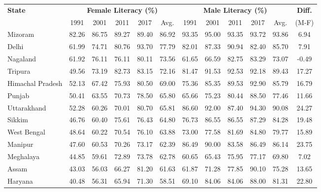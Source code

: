 \begin{table}[h]
    \centering
    \begin{tabular}{lccccccccccc}
        \toprule
        \textbf{State} & \multicolumn{5}{c}{\textbf{Female Literacy (\%)}} & \multicolumn{5}{c}{\textbf{Male Literacy (\%)}} & \textbf{Diff.} \\
        \cmidrule(lr){2-6} \cmidrule(lr){7-11}
        & 1991 & 2001 & 2011 & 2017 & Avg. & 1991 & 2001 & 2011 & 2017 & Avg. & (M-F) \\
        \midrule
        Mizoram          & 82.26 & 86.75 & 89.27 & 89.40 & 86.92 & 93.35 & 95.00 & 93.35 & 93.72 & 93.86 & 6.94 \\
        Delhi           & 61.99 & 74.71 & 80.76 & 93.70 & 77.79 & 82.01 & 87.33 & 90.94 & 82.40 & 85.70 & 7.91 \\  
        Nagaland        & 61.92 & 76.11 & 76.11 & 80.11 & 73.56 & 61.65 & 66.59 & 82.75 & 83.29 & 73.07 & -0.49 \\
        Tripura         & 49.56 & 73.19 & 82.73 & 83.15 & 72.16 & 81.47 & 91.53 & 92.53 & 92.18 & 89.43 & 17.27 \\
        Himachal Pradesh & 52.13 & 67.42 & 75.93 & 80.50 & 69.00 & 75.36 & 85.35 & 89.53 & 92.90 & 85.79 & 16.79 \\
        Punjab          & 50.41 & 63.55 & 70.73 & 78.50 & 65.80 & 65.66 & 75.23 & 80.44 & 88.50 & 77.46 & 11.66 \\
        Uttarakhand     & 52.28 & 60.26 & 70.01 & 80.70 & 65.81 & 86.60 & 92.00 & 87.40 & 94.30 & 90.08 & 24.27 \\
        Sikkim          & 46.76 & 60.40 & 75.61 & 76.43 & 64.80 & 76.73 & 86.55 & 86.55 & 87.29 & 84.28 & 19.48 \\
        West Bengal     & 48.64 & 60.22 & 70.54 & 76.10 & 63.88 & 73.00 & 77.58 & 81.69 & 84.80 & 79.77 & 15.89 \\
        Manipur         & 47.60 & 60.53 & 70.26 & 73.17 & 62.39 & 86.49 & 90.00 & 83.58 & 86.49 & 86.14 & 23.75 \\
        Meghalaya       & 44.85 & 59.61 & 72.89 & 73.78 & 62.78 & 60.65 & 65.43 & 75.95 & 77.17 & 69.80 & 7.02 \\
        Assam           & 43.03 & 56.03 & 66.27 & 81.20 & 61.63 & 61.87 & 71.28 & 77.85 & 90.10 & 75.28 & 13.65 \\
        Haryana         & 40.48 & 56.31 & 65.94 & 71.30 & 58.51 & 69.10 & 84.06 & 84.06 & 88.00 & 81.31 & 22.80 \\

\end{tabular}
\end{table}
